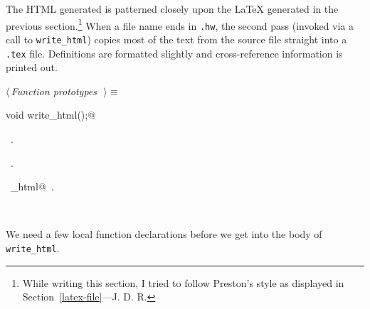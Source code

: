 \documentclass{report}
\begin{document}
The HTML generated is patterned closely upon the {\LaTeX} generated in
the previous section.\footnote{\relax While writing this section, I
tried to follow Preston's style as displayed in
Section~\ref{latex-file}---J. D. R.}  When a file name ends in
\verb|.hw|, the second pass (invoked via a call to \verb|write_html|)
copies most of the text from the source file straight into a
\verb|.tex| file.  Definitions are formatted slightly and
cross-reference information is printed out.

\begin{flushleft} \small
\begin{minipage}{\linewidth} \label{scrap95}
$\langle\,${\it Function prototypes}\nobreak\ {\footnotesize {}}$\,\rangle\equiv$
\vspace{-1ex}
\begin{list}{}{} \item
\mbox{}\verb@extern void write_html();@\\
\mbox{}\verb@@{\NWsep}
\end{list}
\vspace{-1ex}
\footnotesize\addtolength{\baselineskip}{-1ex}
\begin{list}{}{\setlength{\itemsep}{-\parsep}\setlength{\itemindent}{-\leftmargin}}
\item \NWtxtMacroDefBy\ .
\item \NWtxtMacroRefIn\ .
\end{list}
\vspace{-2ex}
\footnotesize\addtolength{\baselineskip}{-1ex}
\begin{list}{}{\setlength{\itemsep}{-\parsep}\setlength{\itemindent}{-\leftmargin}}
\item \NWtxtIdentsUsed\nobreak\  \verb@write_html@\nobreak\ .\end{list}
\end{minipage}\\[4ex]
\end{flushleft}
We need a few local function declarations before we get into the body
of \verb|write_html|.
\end{document}
